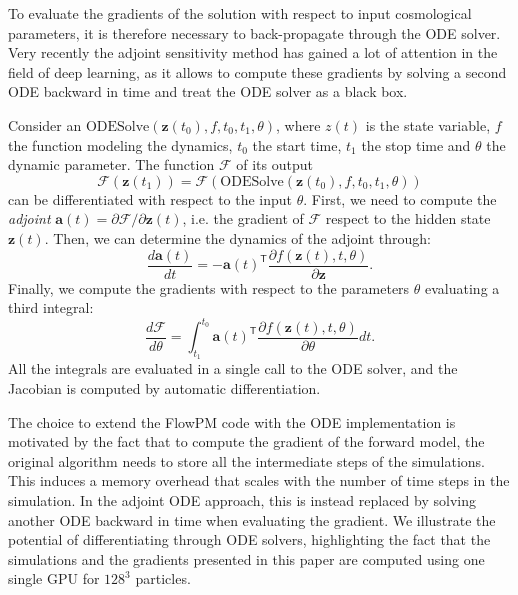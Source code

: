 \documentclass[twocolumn,twocolappendix]{aastex63}
\begin{document}
To evaluate the gradients of the solution with respect to input cosmological parameters, it is therefore necessary to  back-propagate through the ODE solver. Very recently the adjoint sensitivity method \cite{chen2018neural, pontryaginmathematical} has gained a lot of attention in the field of deep learning, as it allows to compute these gradients by solving a second ODE backward in time and treat the ODE solver as a black box. 
 
Consider an $\text{ODESolve}(\textbf{z}(t_0),f,t_0,t_1, \theta)$, 
 where $z(t)$ is the state variable, $f$ the function modeling the dynamics, $t_0$ the start time, $t_1$ the stop time and $\theta$ the dynamic parameter. The function  $\mathcal{F}$ of its output
 \begin{equation}
     \mathcal{F}(\textbf{z}(t_1))=   \mathcal{F} (\text{ODESolve}(\textbf{z}(t_0),f,t_0,t_1, \theta))
 \end{equation}
can be differentiated with respect to the input $\theta$.
 First, we need to compute the \textit{adjoint} $\textbf{a}(t)=\partial \mathcal{F}/ \partial \textbf{z}(t)$, i.e. the gradient of $\mathcal{F}$ respect to the hidden state $\textbf{z}(t)$.  
 Then, we can determine the dynamics of the adjoint through:
 \begin{equation}
     \frac{d \textbf{a}(t)}{dt}=-\textbf{a}(t)^{ \mathsf{T}}\frac{\partial f (\textbf{z}(t),t,\theta)}{\partial \textbf{z}}.
 \end{equation}
 Finally, we compute the gradients with respect to the parameters $\theta$ evaluating a third integral:
 \begin{equation}
     \frac{d\mathcal{F}}{d\theta}=
     \int_{t_1}^{t_0} \textbf{a}(t)^{ \mathsf{T}}
     \frac{\partial f (\textbf{z}(t),t,\theta)}{\partial \theta } dt.
 \end{equation}
All the integrals are evaluated in a single call to the ODE solver, and the Jacobian is computed by automatic differentiation. 
 



The choice to extend the FlowPM code with the ODE implementation is motivated by the fact that to compute the gradient of the forward model, the original algorithm needs to store all the intermediate steps of the simulations. This induces a memory overhead that scales with the number of time steps in the simulation. In the adjoint ODE approach, this is instead replaced by solving another ODE backward in time when evaluating the gradient. 
We illustrate the potential of differentiating through ODE solvers, highlighting the fact that the simulations and the gradients presented in this paper are computed using one single GPU for $128^3$ particles. 
\end{document}

